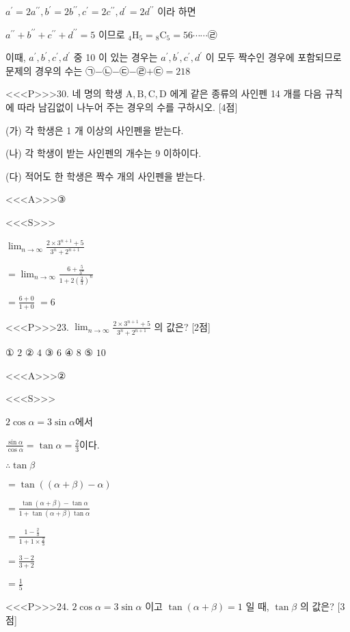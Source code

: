 \documentclass{oblivoir}
\begin{document}
$a^{\prime}=2 a^{\prime \prime}, b^{\prime}=2 b^{\prime \prime}, c^{\prime}=2 c^{\prime \prime}, d^{\prime}=2 d^{\prime \prime}$ 이라 하면

$a^{\prime \prime}+b^{\prime \prime}+c^{\prime \prime}+d^{\prime \prime}=5 $ 이므로
${ }_{4} \mathrm{H}_{5}={ }_{8} \mathrm{C}_{5}=56 \cdots \cdots $㉣

이때, $a^{\prime}, b^{\prime}, c^{\prime}, d^{\prime}$ 중 10 이 있는 경우는 $a^{\prime}, b^{\prime}, c^{\prime}, d^{\prime}$ 이 모두 짝수인 경우에 포함되므로 문제의 경우의 수는 ㉠$-$㉡$-$㉢$-$㉣$+$㉢$=218$


<<<P>>>30. 네 명의 학생 $\mathrm{A}, \mathrm{B}, \mathrm{C}, \mathrm{D}$ 에게 같은 종류의 사인펜 14 개를 다음 규칙에 따라 남김없이 나누어 주는 경우의 수를 구하시오. [4점]

(가) 각 학생은 1 개 이상의 사인펜을 받는다.

(나) 각 학생이 받는 사인펜의 개수는 9 이하이다.

(다) 적어도 한 학생은 짝수 개의 사인펜을 받는다.


<<<A>>>③

<<<S>>>





$\lim _{n \rightarrow \infty} \frac{2 \times 3^{n+1}+5}{3^{n}+2^{n+1}}$

$=\lim _{n \rightarrow \infty} \frac{6+\frac{5}{3^{n}}}{1+2\left(\frac{2}{3}\right)^{n}}$

$=\frac{6+0}{1+0}$
$=6$


<<<P>>>23. $\lim _{n \rightarrow \infty} \frac{2 \times 3^{n+1}+5}{3^{n}+2^{n+1}}$ 의 값은? [2점]

① $2$
② $4$
③ $6$
④ $8$
⑤ $10$


<<<A>>>②

<<<S>>>



$ 2 \cos \alpha =3 \sin \alpha$에서 

$\frac{\sin \alpha}{\cos \alpha}=\tan \alpha=\frac{2}{3}$이다.

$\therefore \tan \beta$

$=\tan ((\alpha+\beta)-\alpha)$

$=\frac{\tan (\alpha+\beta)-\tan \alpha}{1+\tan (\alpha+\beta) \tan \alpha}$

$= \frac{1-\frac{2}{3}}{1+1 \times \frac{2}{3}}$

$=\frac{3-2}{3+2}$

$=\frac{1}{5} $


<<<P>>>24. $2 \cos \alpha=3 \sin \alpha$ 이고 $\tan (\alpha+\beta)=1$ 일 때, $\tan \beta$ 의 값은?
[3점]
\end{document}
